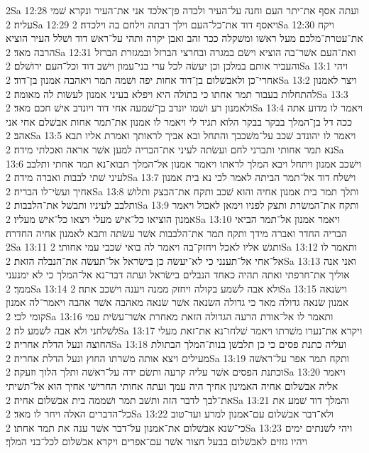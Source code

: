 2Sa 12:28  ועתה אסף את־יתר העם וחנה על־העיר ולכדה פן־אלכד אני את־העיר ונקרא שׁמי עליה׃
2Sa 12:29  ויאסף דוד את־כל־העם וילך רבתה וילחם בה וילכדה׃
2Sa 12:30  ויקח את־עטרת־מלכם מעל ראשׁו ומשׁקלה ככר זהב ואבן יקרה ותהי על־ראשׁ דוד ושׁלל העיר הוציא הרבה מאד׃
2Sa 12:31  ואת־העם אשׁר־בה הוציא וישׂם במגרה ובחרצי הברזל ובמגזרת הברזל והעביר אותם במלכן וכן יעשׂה לכל ערי בני־עמון וישׁב דוד וכל־העם ירושׁלם׃
2Sa 13:1  ויהי אחרי־כן ולאבשׁלום בן־דוד אחות יפה ושׁמה תמר ויאהבה אמנון בן־דוד׃
2Sa 13:2  ויצר לאמנון להתחלות בעבור תמר אחתו כי בתולה היא ויפלא בעיני אמנון לעשׂות לה מאומה׃
2Sa 13:3  ולאמנון רע ושׁמו יונדב בן־שׁמעה אחי דוד ויונדב אישׁ חכם מאד׃
2Sa 13:4  ויאמר לו מדוע אתה ככה דל בן־המלך בבקר בבקר הלוא תגיד לי ויאמר לו אמנון את־תמר אחות אבשׁלם אחי אני אהב׃
2Sa 13:5  ויאמר לו יהונדב שׁכב על־משׁכבך והתחל ובא אביך לראותך ואמרת אליו תבא נא תמר אחותי ותברני לחם ועשׂתה לעיני את־הבריה למען אשׁר אראה ואכלתי מידה׃
2Sa 13:6  וישׁכב אמנון ויתחל ויבא המלך לראתו ויאמר אמנון אל־המלך תבוא־נא תמר אחתי ותלבב לעיני שׁתי לבבות ואברה מידה׃
2Sa 13:7  וישׁלח דוד אל־תמר הביתה לאמר לכי נא בית אמנון אחיך ועשׂי־לו הבריה׃
2Sa 13:8  ותלך תמר בית אמנון אחיה והוא שׁכב ותקח את־הבצק ותלושׁ ותלבב לעיניו ותבשׁל את־הלבבות׃
2Sa 13:9  ותקח את־המשׂרת ותצק לפניו וימאן לאכול ויאמר אמנון הוציאו כל־אישׁ מעלי ויצאו כל־אישׁ מעליו׃
2Sa 13:10  ויאמר אמנון אל־תמר הביאי הבריה החדר ואברה מידך ותקח תמר את־הלבבות אשׁר עשׂתה ותבא לאמנון אחיה החדרה׃
2Sa 13:11  ותגשׁ אליו לאכל ויחזק־בה ויאמר לה בואי שׁכבי עמי אחותי׃
2Sa 13:12  ותאמר לו אל־אחי אל־תענני כי לא־יעשׂה כן בישׂראל אל־תעשׂה את־הנבלה הזאת׃
2Sa 13:13  ואני אנה אוליך את־חרפתי ואתה תהיה כאחד הנבלים בישׂראל ועתה דבר־נא אל־המלך כי לא ימנעני ממך׃
2Sa 13:14  ולא אבה לשׁמע בקולה ויחזק ממנה ויענה וישׁכב אתה׃
2Sa 13:15  וישׂנאה אמנון שׂנאה גדולה מאד כי גדולה השׂנאה אשׁר שׂנאה מאהבה אשׁר אהבה ויאמר־לה אמנון קומי לכי׃
2Sa 13:16  ותאמר לו אל־אודת הרעה הגדולה הזאת מאחרת אשׁר־עשׂית עמי לשׁלחני ולא אבה לשׁמע לה׃
2Sa 13:17  ויקרא את־נערו משׁרתו ויאמר שׁלחו־נא את־זאת מעלי החוצה ונעל הדלת אחריה׃
2Sa 13:18  ועליה כתנת פסים כי כן תלבשׁן בנות־המלך הבתולת מעילים ויצא אותה משׁרתו החוץ ונעל הדלת אחריה׃
2Sa 13:19  ותקח תמר אפר על־ראשׁה וכתנת הפסים אשׁר עליה קרעה ותשׂם ידה על־ראשׁה ותלך הלוך וזעקה׃
2Sa 13:20  ויאמר אליה אבשׁלום אחיה האמינון אחיך היה עמך ועתה אחותי החרישׁי אחיך הוא אל־תשׁיתי את־לבך לדבר הזה ותשׁב תמר ושׁממה בית אבשׁלום אחיה׃
2Sa 13:21  והמלך דוד שׁמע את כל־הדברים האלה ויחר לו מאד׃
2Sa 13:22  ולא־דבר אבשׁלום עם־אמנון למרע ועד־טוב כי־שׂנא אבשׁלום את־אמנון על־דבר אשׁר ענה את תמר אחתו׃
2Sa 13:23  ויהי לשׁנתים ימים ויהיו גזזים לאבשׁלום בבעל חצור אשׁר עם־אפרים ויקרא אבשׁלום לכל־בני המלך׃
